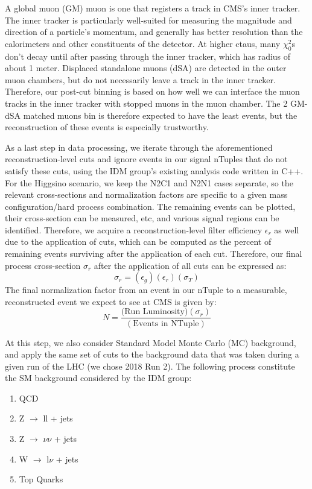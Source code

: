 \documentclass{article}
\begin{document}
\par
A global muon (GM) muon is one that registers a track in CMS's  inner tracker. The inner tracker is particularly well-suited for measuring the magnitude and direction of a particle's momentum, and generally has better resolution than the calorimeters and other constituents of the detector. At higher ctaus, many $\chi^{2}_{0}$s don't decay until after passing through the inner tracker, which has radius of about 1 meter. Displaced standalone muons (dSA) are detected in the outer muon chambers, but do not necessarily leave a track in the inner tracker. Therefore, our post-cut binning is based on how well we can interface the muon tracks in the inner tracker with stopped muons in the muon chamber. The 2 GM-dSA matched muons bin is therefore expected to have the least events, but the reconstruction of these events is especially trustworthy. 
\par
As a last step in data processing, we iterate through the aforementioned reconstruction-level cuts and ignore events in our signal nTuples that do not satisfy these cuts, using the IDM group's existing analysis code written in C++. For the Higgsino scenario, we keep the N2C1 and N2N1 cases separate, so the relevant cross-sections and normalization factors are specific to a given mass configuration/hard process combination. The remaining events can be plotted, their cross-section can be measured, etc, and various signal regions can be identified. Therefore, we acquire a reconstruction-level filter efficiency  $\epsilon_{r}$ as well due to the application of cuts, which can be computed as the percent of remaining events surviving after the application of each cut. Therefore, our final process cross-section $\sigma_{r}$ after the application of all cuts can be expressed as:
\[\sigma_{r} = (\epsilon_{g})(\epsilon_{r})(\sigma_{T})\]
The final normalization factor from an event in our nTuple to a measurable, reconstructed event we expect to see at CMS is given by:
\[N = \frac{\text{(Run Luminosity)}(\sigma_{r})}{(\text{Events in NTuple})}\]
\par
At this step, we also consider Standard Model Monte Carlo (MC) background, and apply the same set of cuts to the background data that was taken during a given run of the LHC (we chose 2018 Run 2). The following process constitute the SM background considered by the IDM group:
\begin{enumerate}
    \item QCD
    \item Z $\rightarrow$ ll + jets
    \item Z $\rightarrow$ $\nu\nu$ + jets
    \item W $\rightarrow$ l$\nu$ + jets
    \item Top Quarks
\end{enumerate}
\end{document}

